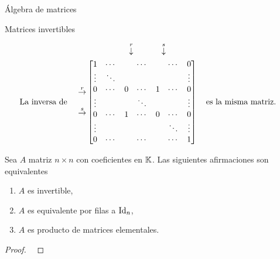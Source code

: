 \begin{chapter}{\'Algebra de matrices}
\begin{section}{Matrices invertibles}
\begin{ejemplo*}
            \begin{align*}
            &\begin{matrix}
            {}^{}&{}^{}&{}^{}&{}^{}&{}^{}&\overset{r}{\downarrow}&{}^{}&{}^{}&{}^{}{}^{}\overset{s}{\downarrow}&{}^{}
            \end{matrix} \\
            \text{La inversa de \quad}\begin{matrix}
            {}^{}\\{}^{}\\
            \overset{r}{\to}\\
            {}^{}\\
            \overset{s}{\to}\\{}^{}\\
            {}^{}
            \end{matrix}
            &\begin{bmatrix}
            1 & \cdots &  &\cdots &&\cdots& 0  \\
            \vdots  & \ddots  & & &&& \vdots \\
            0 & \cdots &0 &\cdots&1&\cdots &0 \\
            \vdots  &   & &\ddots &&& \vdots \\
            0  & \cdots  &1 &\cdots &0& \cdots& 0 \\
            \vdots  &   & & &&\ddots& \vdots \\
            0  & \cdots  & &\cdots &&\cdots& 1
            \end{bmatrix}
            \text{\quad es la misma matriz.\quad}
            \end{align*}
        
                        
        
    
\end{ejemplo*}
        
        
            
            
            \begin{teorema}\label{mtrx-inv-equiv} Sea $A$ matriz $n \times n$ con coeficientes en $\mathbb K$. Las siguientes afirmaciones son equivalentes
                \begin{enumerate}
                    \item\label{teo-inv-1} $A$ es invertible,
                    \item\label{teo-inv-2} $A$  es equivalente por filas a $\operatorname{Id}_n$, 
                    \item\label{teo-inv-3} $A$ es producto de matrices elementales.
                \end{enumerate}
            \end{teorema}
            \begin{proof}
                \


\end{proof}
\end{section}
\end{chapter}
